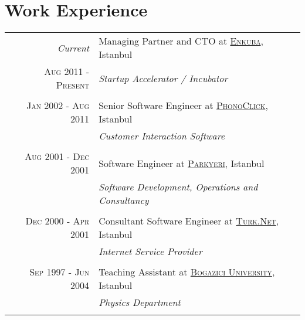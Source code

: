 \documentclass[a4paper,10pt]{article}
\begin{document}
\section{Work Experience}
\begin{tabular}{r|p{11cm}}
  \emph{Current}                & Managing Partner and CTO at \href{http://www.enkuba.com}{\textsc{Enkuba}}, Istanbul \\
  \textsc{Aug 2011 - Present}   & \emph{Startup Accelerator / Incubator} \\

  \multicolumn{2}{c}{} \\

  \textsc{Jan 2002 - Aug 2011}  & Senior Software Engineer at \href{http://www.phonoclick.com}{\textsc{PhonoClick}}, Istanbul \\
                                & \emph{Customer Interaction Software}  \\

  \multicolumn{2}{c}{} \\
 
  \textsc{Aug 2001 - Dec 2001}  & Software Engineer at \href{http://www.parkyeri.com}{\textsc{Parkyeri}}, Istanbul \\ 
                                & \emph{Software Development, Operations and Consultancy} \\

  \multicolumn{2}{c}{} \\

  \textsc{Dec 2000 - Apr 2001}  & Consultant Software Engineer at \href{http://turk.net/}{\textsc{Turk.Net}}, Istanbul \\ 
                                & \emph{Internet Service Provider} \\

  \multicolumn{2}{c}{} \\

  \textsc{Sep 1997 - Jun 2004}  & Teaching Assistant at \href{http://www.boun.edu.tr/}{\textsc{Bogazici University}}, Istanbul \\ 
                                & \emph{Physics Department} \\

  \multicolumn{2}{c}{} \\

\end{tabular}

\end{document}
